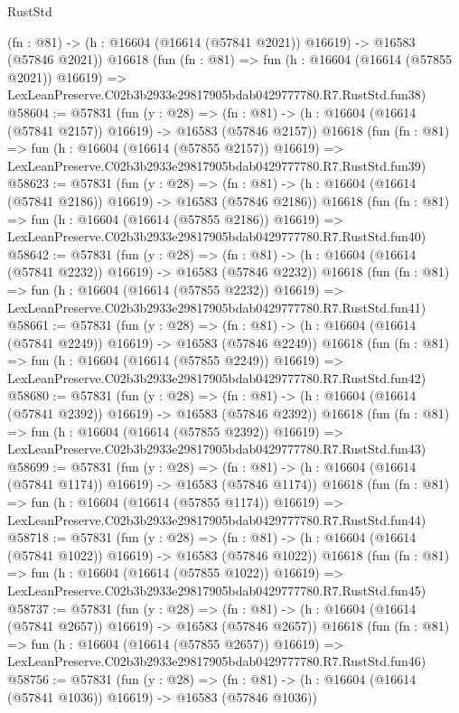 \begin{lexlean}{RustStd}
\begin{coremodule}
    (fn : @81) -> (h : @16604 (@16614 (@57841 @2021)) @16619) -> @16583 (@57846 @2021))
    @16618
    (fun (fn : @81) =>
    fun (h : @16604 (@16614 (@57855 @2021)) @16619) =>
    LexLeanPreserve.C02b3b2933e29817905bdab0429777780.R7.RustStd.fun38)
@58604 := @57831
    (fun (y : @28) =>
    (fn : @81) -> (h : @16604 (@16614 (@57841 @2157)) @16619) -> @16583 (@57846 @2157))
    @16618
    (fun (fn : @81) =>
    fun (h : @16604 (@16614 (@57855 @2157)) @16619) =>
    LexLeanPreserve.C02b3b2933e29817905bdab0429777780.R7.RustStd.fun39)
@58623 := @57831
    (fun (y : @28) =>
    (fn : @81) -> (h : @16604 (@16614 (@57841 @2186)) @16619) -> @16583 (@57846 @2186))
    @16618
    (fun (fn : @81) =>
    fun (h : @16604 (@16614 (@57855 @2186)) @16619) =>
    LexLeanPreserve.C02b3b2933e29817905bdab0429777780.R7.RustStd.fun40)
@58642 := @57831
    (fun (y : @28) =>
    (fn : @81) -> (h : @16604 (@16614 (@57841 @2232)) @16619) -> @16583 (@57846 @2232))
    @16618
    (fun (fn : @81) =>
    fun (h : @16604 (@16614 (@57855 @2232)) @16619) =>
    LexLeanPreserve.C02b3b2933e29817905bdab0429777780.R7.RustStd.fun41)
@58661 := @57831
    (fun (y : @28) =>
    (fn : @81) -> (h : @16604 (@16614 (@57841 @2249)) @16619) -> @16583 (@57846 @2249))
    @16618
    (fun (fn : @81) =>
    fun (h : @16604 (@16614 (@57855 @2249)) @16619) =>
    LexLeanPreserve.C02b3b2933e29817905bdab0429777780.R7.RustStd.fun42)
@58680 := @57831
    (fun (y : @28) =>
    (fn : @81) -> (h : @16604 (@16614 (@57841 @2392)) @16619) -> @16583 (@57846 @2392))
    @16618
    (fun (fn : @81) =>
    fun (h : @16604 (@16614 (@57855 @2392)) @16619) =>
    LexLeanPreserve.C02b3b2933e29817905bdab0429777780.R7.RustStd.fun43)
@58699 := @57831
    (fun (y : @28) =>
    (fn : @81) -> (h : @16604 (@16614 (@57841 @1174)) @16619) -> @16583 (@57846 @1174))
    @16618
    (fun (fn : @81) =>
    fun (h : @16604 (@16614 (@57855 @1174)) @16619) =>
    LexLeanPreserve.C02b3b2933e29817905bdab0429777780.R7.RustStd.fun44)
@58718 := @57831
    (fun (y : @28) =>
    (fn : @81) -> (h : @16604 (@16614 (@57841 @1022)) @16619) -> @16583 (@57846 @1022))
    @16618
    (fun (fn : @81) =>
    fun (h : @16604 (@16614 (@57855 @1022)) @16619) =>
    LexLeanPreserve.C02b3b2933e29817905bdab0429777780.R7.RustStd.fun45)
@58737 := @57831
    (fun (y : @28) =>
    (fn : @81) -> (h : @16604 (@16614 (@57841 @2657)) @16619) -> @16583 (@57846 @2657))
    @16618
    (fun (fn : @81) =>
    fun (h : @16604 (@16614 (@57855 @2657)) @16619) =>
    LexLeanPreserve.C02b3b2933e29817905bdab0429777780.R7.RustStd.fun46)
@58756 := @57831
    (fun (y : @28) =>
    (fn : @81) -> (h : @16604 (@16614 (@57841 @1036)) @16619) -> @16583 (@57846 @1036))

\end{coremodule}
\end{lexlean}
